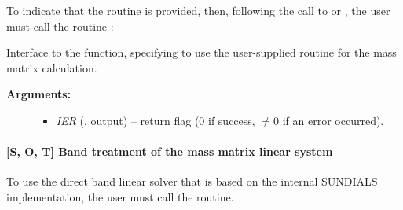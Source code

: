 \documentclass[letterpaper,10pt,english]{sphinxmanual}
\begin{document}
To indicate that the {\hyperref[f_interface/Usage:f/_/FARKDMASS]{\emph{}}} routine is provided, then,
following the call to {\hyperref[f_interface/Usage:f/_/FARKMASSDENSE]{\emph{}}} or
{\hyperref[f_interface/Usage:f/_/FARKMASSLAPACKDENSE]{\emph{}}}, the user must call the routine
{\hyperref[f_interface/Usage:f/_/FARKDENSESETMASS]{\emph{}}}:

\begin{fulllineitems}
\label{f_interface/Usage:f/_/FARKDENSESETMASS}
Interface to the {\hyperref[c_interface/User_callable:c.ARKDlsSetDenseMassFn]{\emph{}}} function,
specifying to use the user-supplied routine {\hyperref[f_interface/Usage:f/_/FARKDMASS]{\emph{}}}
for the mass matrix calculation.
\begin{description}
\item[{\textbf{Arguments:}}] \leavevmode\begin{itemize}
\item {} 
\emph{IER} (, output) -- return flag (0 if success,
\(\ne 0\) if an error occurred).

\end{itemize}

\end{description}

\end{fulllineitems}



\paragraph{{[}\textbf{S}, \textbf{O}, \textbf{T}{]} Band treatment of the mass matrix linear system}
\label{f_interface/Usage:s-o-t-band-treatment-of-the-mass-matrix-linear-system}
To use the direct band linear solver that is based on the internal
SUNDIALS implementation, the user must call the {\hyperref[f_interface/Usage:f/_/FARKMASSBAND]{\emph{}}}
routine.
\end{document}
